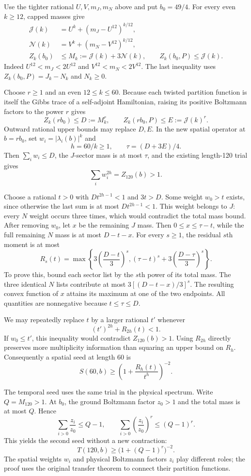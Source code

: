 \documentclass[11pt]{article}
\begin{document}
Use the tighter rational $U,V,m_J,m_N$ above and put $b_0=49/4$.
For every even $k\ge12$, capped masses give
\begin{align*}
 \mathcal J(k)&=U^k+(m_J-U^{12})^{k/12},\\
 \mathcal N(k)&=V^k+(m_N-V^{12})^{k/12},\\
 Z_k(b_0)&\le M_k:=\mathcal J(k)+3\mathcal N(k),\qquad
 Z_k(b_0,P)\le\mathcal J(k).
\end{align*}
Indeed $U^{12}<m_J<2U^{12}$ and $V^{12}<m_N<2V^{12}$.
The last inequality uses $Z_k(b_0,P)=J_k-N_k$ and $N_k\ge0$.

Choose $r\ge1$ and an even $12\le k\le60$. Because each twisted partition
function is itself the Gibbs trace of a self-adjoint Hamiltonian, raising
its positive Boltzmann factors to the power $r$ gives
\[
 Z_k(rb_0)\le D:=M_k^r,\qquad
 Z_k(rb_0,P)\le E:=\mathcal J(k)^r.
\]
Outward rational upper bounds may replace $D,E$. In the new spatial
operator at $b=rb_0$, set $w_i=|\lambda_i(b)|^k$ and
\[
 h=60/k\ge1,\qquad \tau=(D+3E)/4.
\]
Then $\sum_iw_i\le D$, the $J$-sector mass is at most $\tau$, and
the existing length-120 trial gives
\[
 \sum_iw_i^{2h}=Z_{120}(b)>1.
\]

Choose a rational $t>0$ with $Dt^{2h-1}<1$ and $3t>D$.
Some weight $w_0>t$ exists, since otherwise the last sum is at most
$Dt^{2h-1}<1$. This weight belongs to $J$: every $N$ weight occurs
three times, which would contradict the total mass bound.
After removing $w_0$, let $x$ be the remaining $J$ mass. Then
$0\le x\le\tau-t$, while the full remaining $N$ mass is at most
$D-t-x$. For every $s\ge1$, the residual $s$th moment is at most
\[
 R_s(t)=\max\left\{
   3\left(\frac{D-t}{3}\right)^s,
   (\tau-t)^s+3\left(\frac{D-\tau}{3}\right)^s
 \right\}.
\]
To prove this, bound each sector list by the $s$th power of its total mass.
The three identical $N$ lists contribute at most
$3[(D-t-x)/3]^s$. The resulting convex function of $x$ attains its maximum
at one of the two endpoints. All quantities are nonnegative because
$t\le\tau\le D$.

We may repeatedly replace $t$ by a larger rational $t'$ whenever
\[
 (t')^{2h}+R_{2h}(t)<1.
\]
If $w_0\le t'$, this inequality would contradict $Z_{120}(b)>1$.
Using $R_{2h}$ directly preserves more multiplicity information than
squaring an upper bound on $R_h$.
Consequently a spatial seed at length 60 is
\[
 S(60,b)\ge\left(1+\frac{R_h(t)}{t^h}\right)^{-2}.
\]

The temporal seed uses the same trial in the physical spectrum.
Write $Q=M_{120}>1$. At $b_0$, the ground Boltzmann factor $z_0>1$
and the total mass is at most $Q$. Hence
\[
 \sum_{i>0}\frac{z_i}{z_0}\le Q-1,\qquad
 \sum_{i>0}\left(\frac{z_i}{z_0}\right)^r\le(Q-1)^r.
\]
This yields the second seed without a new contraction:
\[
 T(120,b)\ge\bigl(1+(Q-1)^r\bigr)^{-2}.
\]
The spatial weights $w_i$ and physical Boltzmann factors $z_i$ play
different roles; the proof uses the original transfer theorem to connect
their partition functions.
\end{document}
